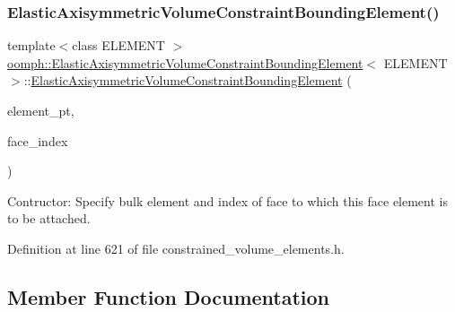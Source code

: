 \subsubsection{\texorpdfstring{Elastic\+Axisymmetric\+Volume\+Constraint\+Bounding\+Element()}{ElasticAxisymmetricVolumeConstraintBoundingElement()}}
{\footnotesize\ttfamily template$<$class E\+L\+E\+M\+E\+NT $>$ \\
\hyperlink{classoomph_1_1ElasticAxisymmetricVolumeConstraintBoundingElement}{oomph\+::\+Elastic\+Axisymmetric\+Volume\+Constraint\+Bounding\+Element}$<$ E\+L\+E\+M\+E\+NT $>$\+::\hyperlink{classoomph_1_1ElasticAxisymmetricVolumeConstraintBoundingElement}{Elastic\+Axisymmetric\+Volume\+Constraint\+Bounding\+Element} (\begin{DoxyParamCaption}\item[{Finite\+Element $\ast$const \&}]{element\+\_\+pt,  }\item[{const int \&}]{face\+\_\+index }\end{DoxyParamCaption})\hspace{0.3cm}{\ttfamily [inline]}}



Contructor\+: Specify bulk element and index of face to which this face element is to be attached. 



Definition at line 621 of file constrained\+\_\+volume\+\_\+elements.\+h.



\subsection{Member Function Documentation}
\mbox{\label{classoomph_1_1ElasticAxisymmetricVolumeConstraintBoundingElement_adc7f5296f867251fe4b97b01f40c11e7}} 
